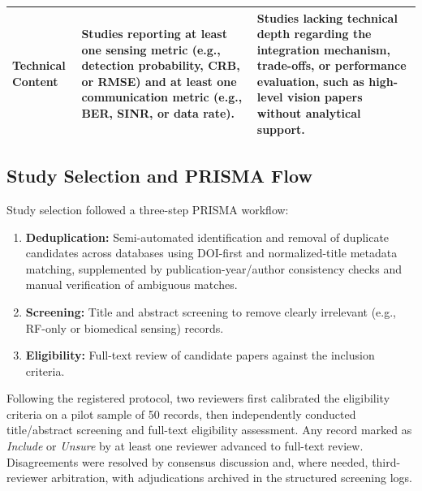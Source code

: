 \documentclass[letterpaper,journal]{IEEEtran}
\begin{document}
\begin{table}[!t]
\begin{tabularx}{\textwidth}{@{}>{\raggedright\arraybackslash}p{2.1cm} >{\raggedright\arraybackslash}X >{\raggedright\arraybackslash}X@{}}
        \textbf{Technical Content}                                                                                                                                                         &
        Studies reporting at least one \textbf{sensing metric} (e.g., detection probability, CRB, or RMSE) and at least one \textbf{communication metric} (e.g., BER, SINR, or data rate). &
        Studies lacking technical depth regarding the integration mechanism, trade-offs, or performance evaluation, such as high-level vision papers without analytical support.             \\
        \bottomrule
    \end{tabularx}
\end{table}


\subsection{Study Selection and PRISMA Flow}
Study selection followed a three-step PRISMA workflow:
\begin{enumerate}
    \item \textbf{Deduplication:} Semi-automated identification and removal of duplicate candidates across databases using DOI-first and normalized-title metadata matching, supplemented by publication-year/author consistency checks and manual verification of ambiguous matches.
    \item \textbf{Screening:} Title and abstract screening to remove clearly irrelevant (e.g., RF-only or biomedical sensing) records.
    \item \textbf{Eligibility:} Full-text review of candidate papers against the inclusion criteria.
\end{enumerate}

Following the registered protocol, two reviewers first calibrated the eligibility criteria on a pilot sample of 50 records, then independently conducted title/abstract screening and full-text eligibility assessment. Any record marked as \textit{Include} or \textit{Unsure} by at least one reviewer advanced to full-text review. Disagreements were resolved by consensus discussion and, where needed, third-reviewer arbitration, with adjudications archived in the structured screening logs.
\end{document}
